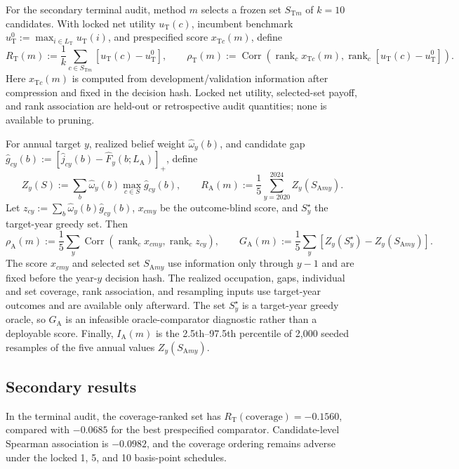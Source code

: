 For the secondary terminal audit, method \(m\) selects a frozen set
\(S_{\mathrm Tm}\) of \(k=10\) candidates.  With locked net utility
\(u_{\mathrm T}(c)\), incumbent benchmark
\(u_{\mathrm T}^0:=\max_{i\in L_{\mathrm T}}u_{\mathrm T}(i)\), and
prespecified score \(x_{\mathrm Tc}(m)\), define
\[
 R_{\mathrm T}(m):=\frac1k\sum_{c\in S_{\mathrm Tm}}
   [u_{\mathrm T}(c)-u_{\mathrm T}^0],\qquad
 \rho_{\mathrm T}(m):=
 \operatorname{Corr}\!\left(
   \operatorname{rank}_c x_{\mathrm Tc}(m),
   \operatorname{rank}_c[u_{\mathrm T}(c)-u_{\mathrm T}^0]\right).
\]
Here \(x_{\mathrm Tc}(m)\) is computed from development/validation information
after compression and fixed in the decision hash.  Locked net utility,
selected-set payoff, and rank association are held-out or retrospective audit
quantities; none is available to pruning.

For annual target \(y\), realized belief weight \(\widehat\omega_y(b)\), and
candidate gap
\(\widehat g_{cy}(b):=
[\widehat j_{cy}(b)-\widehat F_y(b;L_{\mathrm A})]_+\), define
\[
 Z_y(S):=\sum_b\widehat\omega_y(b)\max_{c\in S}\widehat g_{cy}(b),
 \qquad
 R_{\mathrm A}(m):=\frac15\sum_{y=2020}^{2024}Z_y(S_{\mathrm Amy}).
\]
Let \(z_{cy}:=\sum_b\widehat\omega_y(b)\widehat g_{cy}(b)\),
\(x_{cmy}\) be the outcome-blind score, and \(S_y^\star\) the target-year
greedy set.  Then
\[
 \rho_{\mathrm A}(m):=\frac15\sum_y
   \operatorname{Corr}(\operatorname{rank}_c x_{cmy},
                       \operatorname{rank}_c z_{cy}),\qquad
 G_{\mathrm A}(m):=\frac15\sum_y
   [Z_y(S_y^\star)-Z_y(S_{\mathrm Amy})].
\]
The score \(x_{cmy}\) and selected set \(S_{\mathrm Amy}\) use information
only through \(y-1\) and are fixed before the year-\(y\) decision hash.  The
realized occupation, gaps, individual and set coverage, rank association, and
resampling inputs use target-year outcomes and are available only afterward.
The set \(S_y^\star\) is a target-year greedy oracle, so \(G_{\mathrm A}\) is
an infeasible oracle-comparator diagnostic rather than a deployable score.
Finally, \(I_{\mathrm A}(m)\) is the 2.5th--97.5th percentile of 2,000 seeded
resamples of the five annual values \(Z_y(S_{\mathrm Amy})\).

\subsection{Secondary results}

In the terminal audit, the coverage-ranked set has
\(R_{\mathrm T}(\mathrm{coverage})=-0.1560\), compared with \(-0.0685\) for
the best prespecified comparator.  Candidate-level Spearman association is
\(-0.0982\), and the coverage ordering remains adverse under the locked 1, 5,
and 10 basis-point schedules.

